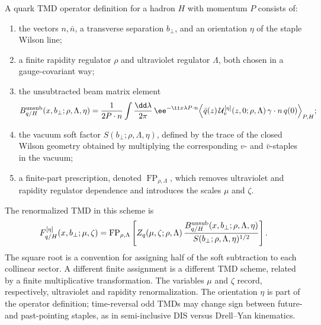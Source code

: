 \begin{definition}
\label{def:qcd-tmd-operator-definition}
A quark TMD operator definition for a hadron \(H\) with momentum \(P\) consists of:
\begin{enumerate}
  \item the vectors \(n,\bar n\), a transverse separation \(b_\perp\), and an
  orientation \(\eta\) of the staple Wilson line;
  \item a finite rapidity regulator \(\rho\) and ultraviolet regulator
  \(\Lambda\), both chosen in a gauge-covariant way;
  \item the unsubtracted beam matrix element
  \[
    B^{\rm unsub}_{q/H}(x,b_\perp;\rho,\Lambda,\eta)
    =
    \frac1{2P\cdot n}
    \int\frac{\dd\lambda}{2\pi}\,
    \ee^{-\ii x\lambda P\cdot n}
    \Bigl\langle
    \bar q(z)\,
    \mathcal U^{[\eta]}_{v}(z,0;\rho,\Lambda)\,
    \gamma\cdot n\,q(0)
    \Bigr\rangle_{P,H};
  \]
  \item the vacuum soft factor
  \(S(b_\perp;\rho,\Lambda,\eta)\), defined by the trace of the closed Wilson
  geometry obtained by multiplying the corresponding \(v\)- and
  \(\bar v\)-staples in the vacuum;
  \item a finite-part prescription, denoted
  \(\operatorname{FP}_{\rho,\Lambda}\), which removes ultraviolet and rapidity
  regulator dependence and introduces the scales \(\mu\) and \(\zeta\).
\end{enumerate}
The renormalized TMD in this scheme is
\begin{equation}
  F_{q/H}^{[\eta]}(x,b_\perp;\mu,\zeta)
  =
  \operatorname{FP}_{\rho,\Lambda}
  \left[
    Z_q(\mu,\zeta;\rho,\Lambda)\,
    \frac{
      B^{\rm unsub}_{q/H}(x,b_\perp;\rho,\Lambda,\eta)
    }{
      S(b_\perp;\rho,\Lambda,\eta)^{1/2}
    }
  \right].
  \label{eq:qcd-renormalized-tmd-definition}
\end{equation}
The square root is a convention for assigning half of the soft subtraction to
each collinear sector.  A different finite assignment is a different TMD
scheme, related by a finite multiplicative transformation.  The variables
\(\mu\) and \(\zeta\) record, respectively, ultraviolet and rapidity
renormalization.  The orientation \(\eta\) is part of the operator definition;
time-reversal odd TMDs may change sign between future- and past-pointing
staples, as in semi-inclusive DIS versus Drell--Yan kinematics.
\end{definition}

